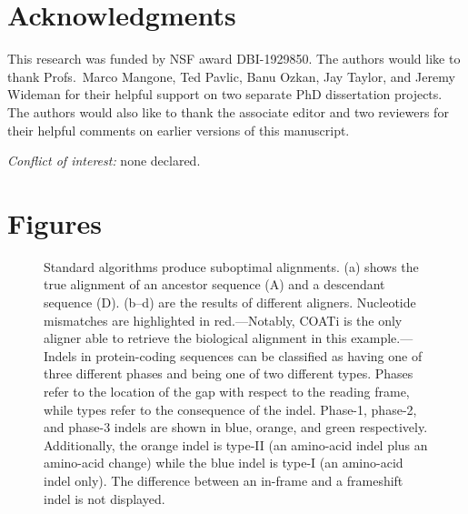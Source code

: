 \documentclass[12pt,letterpaper]{article}
\begin{document}

\section*{Acknowledgments}

This research was funded by NSF award DBI-1929850.
%
The authors would like to thank Profs.\ Marco Mangone, Ted Pavlic, Banu Ozkan, Jay Taylor, and Jeremy Wideman for their helpful support on two separate PhD dissertation projects. The authors would also like to thank the associate editor and two reviewers for their helpful comments on earlier versions of this manuscript.

\noindent \textit{Conflict of interest:} none declared.

\newpage
\section*{Figures}

\begin{figure}[ht]
    \centering%
    \par
    \caption{
        Standard algorithms produce suboptimal alignments.
        (a) shows the true alignment of an ancestor sequence (A) and a descendant sequence (D).
        (b--d) are the results of different aligners. Nucleotide mismatches are highlighted in red.---Notably, COATi is the only aligner able to retrieve the biological alignment in this example.---%
        Indels in protein-coding sequences can be classified as having one of three different phases and being one of two different types.
        Phases refer to the location of the gap with respect to the reading frame, while types refer to the consequence of the indel.
        Phase-1, phase-2, and phase-3 indels are shown in blue, orange, and green respectively.
        Additionally, the orange indel is type-II (an amino-acid indel plus an amino-acid change) while the blue indel is type-I (an amino-acid indel only). The difference between an in-frame and a frameshift indel is not displayed.
        \label{fig:aln}}
\end{figure}
\end{document}
